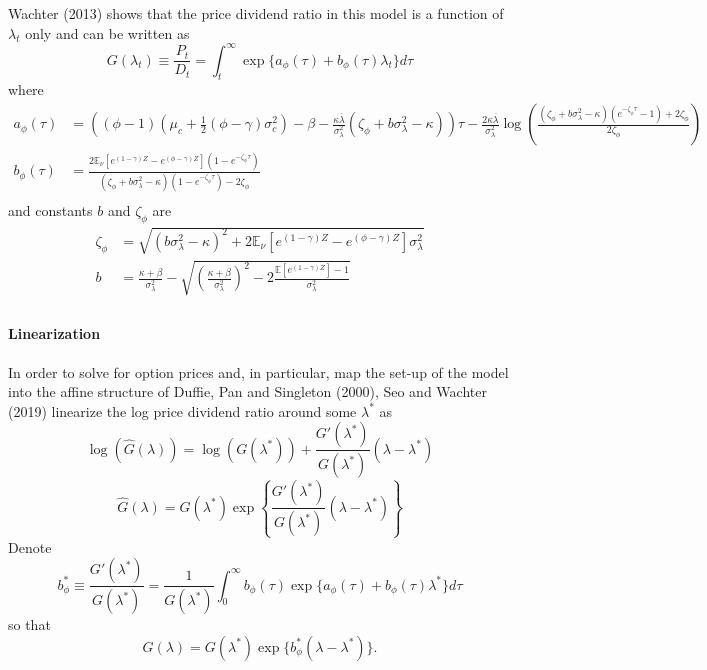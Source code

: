 \documentclass[11pt]{article}
\begin{document}
Wachter (2013) shows that the price dividend ratio in this model is a function of $\lambda_t$
only and can be written as
\[G(\lambda_t) \equiv \frac{P_t}{D_t} = \int_t^\infty \exp\{a_\phi(\tau) + b_\phi(\tau)\lambda_t\}d\tau\]
where
\begin{equation}\label{eq:pd_coefficients}
    \begin{aligned}
        a_\phi(\tau) &= \left((\phi-1)\left(\mu_c + \frac12(\phi-\gamma)\sigma_c^2\right) - \beta - \frac{\kappa\overline{\lambda}}{\sigma_\lambda^2}(\zeta_\phi + b \sigma_\lambda^2 - \kappa)\right)\tau 
        - \frac{2\kappa \overline{\lambda}}{\sigma_\lambda^2}\log\left(\frac{(\zeta_\phi+b\sigma_\lambda^2 - \kappa)(e^{-\zeta_\phi \tau} - 1) + 2\zeta_\phi}{2\zeta_\phi}\right) \\
        b_\phi(\tau) &= \frac{2\mathbb{E}_\nu\left[e^{(1-\gamma)Z}-e^{(\phi-\gamma)Z}\right](1-e^{-\zeta_\phi \tau})}{(\zeta_\phi + b \sigma_\lambda^2-\kappa)(1-e^{-\zeta_\phi \tau}) - 2\zeta_\phi} \\
    \end{aligned}    
\end{equation}
and constants $b$ and $\zeta_\phi$ are
\begin{equation}\label{eq:coefficients_zeta_b}
    \begin{aligned}
        \zeta_\phi &= \sqrt{(b\sigma_\lambda^2 - \kappa)^2 + 2\mathbb{E}_\nu\left[e^{(1-\gamma)Z} - e^{(\phi-\gamma)Z}\right]\sigma_\lambda^2} \\
        b          &= \frac{\kappa + \beta}{\sigma_\lambda^2} - \sqrt{\left(\frac{\kappa+\beta}{\sigma_\lambda^2}\right)^2 - 2\frac{\mathbb{E}\left[e^{(1-\gamma)Z}\right] - 1}{\sigma_\lambda^2}}  \\
    \end{aligned}  
\end{equation}

\paragraph{Linearization}

In order to solve for option prices and, in particular, map the set-up of the model
into the affine structure of Duffie, Pan and Singleton (2000), Seo and Wachter (2019)
linearize the log price dividend ratio around some $\lambda^*$ as
\[\log(\hat{G}(\lambda)) = \log(G(\lambda^*)) + \frac{G'(\lambda^*)}{G(\lambda^*)}(\lambda - \lambda^*)\]
\[\hat{G}(\lambda) = G(\lambda^*)\exp\left\{\frac{G'(\lambda^*)}{G(\lambda^*)}(\lambda - \lambda^*)\right\}\]
Denote 
\[b_\phi^* \equiv \frac{G'(\lambda^*)}{G(\lambda^*)} = \frac{1}{G(\lambda^*)}\int_0^\infty b_\phi(\tau)\exp\{a_\phi(\tau) + b_\phi(\tau)\lambda^*\}d\tau\]
so that
\begin{equation}\label{eq:linearized_pd}
    \hat{G}(\lambda) = G(\lambda^*)\exp\{b_\phi^* (\lambda - \lambda^*)\}.
\end{equation}
\end{document}
